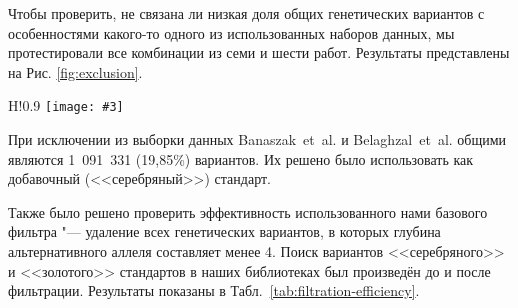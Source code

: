 \documentclass[a4paper,12pt]{article}
\newcommand{\figa}[5]{
\begin{wrapfigure}{#1}{#2\textwidth}
\centering
\texttt{[image: \#3]}
\caption{\label{#4}#5}
\end{wrapfigure}
}
\begin{document}
Чтобы проверить, не связана ли низкая доля общих генетических вариантов с особенностями какого-то одного из использованных наборов данных, мы протестировали все комбинации из семи и шести работ.
Результаты представлены на Рис. \ref{fig:exclusion}.

\figa{H!}{0.9}{Exclusion_6.pdf}{fig:exclusion}{Исключение образцов из выборки (7 и 6 образцов)}

При исключении из выборки данных Banaszak~et~al. и Belaghzal~et~al. общими являются 1~091~331 (19,85\%) вариантов.
Их решено было использовать как добавочный (<<серебряный>>) стандарт.

Также было решено проверить эффективность использованного нами базового фильтра "--- удаление всех генетических вариантов, в которых глубина альтернативного аллеля составляет менее 4.
Поиск вариантов <<серебряного>> и <<золотого>> стандартов в наших библиотеках был произведён до и после фильтрации.
Результаты показаны в Табл.~\ref{tab:filtration-efficiency}.
\end{document}
